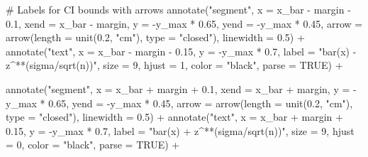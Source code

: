 \documentclass[
  letterpaper,
  DIV=11,
  numbers=noendperiod]{scrreprt}
\newenvironment{Shaded}{\begin{snugshade}}{\end{snugshade}}
\newcommand{\AttributeTok}[1]{\textcolor[rgb]{0.40,0.45,0.13}{#1}}
\newcommand{\CommentTok}[1]{\textcolor[rgb]{0.37,0.37,0.37}{#1}}
\newcommand{\ConstantTok}[1]{\textcolor[rgb]{0.56,0.35,0.01}{#1}}
\newcommand{\DecValTok}[1]{\textcolor[rgb]{0.68,0.00,0.00}{#1}}
\newcommand{\FloatTok}[1]{\textcolor[rgb]{0.68,0.00,0.00}{#1}}
\newcommand{\FunctionTok}[1]{\textcolor[rgb]{0.28,0.35,0.67}{#1}}
\newcommand{\NormalTok}[1]{\textcolor[rgb]{0.00,0.23,0.31}{#1}}
\newcommand{\SpecialCharTok}[1]{\textcolor[rgb]{0.37,0.37,0.37}{#1}}
\newcommand{\StringTok}[1]{\textcolor[rgb]{0.13,0.47,0.30}{#1}}
\begin{document}
\begin{Shaded}
\begin{Highlighting}[]
  \CommentTok{\# Labels for CI bounds with arrows}
  \FunctionTok{annotate}\NormalTok{(}\StringTok{"segment"}\NormalTok{, }\AttributeTok{x =}\NormalTok{ x\_bar }\SpecialCharTok{{-}}\NormalTok{ margin }\SpecialCharTok{{-}} \FloatTok{0.1}\NormalTok{, }\AttributeTok{xend =}\NormalTok{ x\_bar }\SpecialCharTok{{-}}\NormalTok{ margin, }
           \AttributeTok{y =} \SpecialCharTok{{-}}\NormalTok{y\_max }\SpecialCharTok{*} \FloatTok{0.65}\NormalTok{, }\AttributeTok{yend =} \SpecialCharTok{{-}}\NormalTok{y\_max }\SpecialCharTok{*} \FloatTok{0.45}\NormalTok{,}
           \AttributeTok{arrow =} \FunctionTok{arrow}\NormalTok{(}\AttributeTok{length =} \FunctionTok{unit}\NormalTok{(}\FloatTok{0.2}\NormalTok{, }\StringTok{"cm"}\NormalTok{), }\AttributeTok{type =} \StringTok{"closed"}\NormalTok{),}
           \AttributeTok{linewidth =} \FloatTok{0.5}\NormalTok{) }\SpecialCharTok{+}
  \FunctionTok{annotate}\NormalTok{(}\StringTok{"text"}\NormalTok{, }\AttributeTok{x =}\NormalTok{ x\_bar }\SpecialCharTok{{-}}\NormalTok{ margin }\SpecialCharTok{{-}} \FloatTok{0.15}\NormalTok{, }\AttributeTok{y =} \SpecialCharTok{{-}}\NormalTok{y\_max }\SpecialCharTok{*} \FloatTok{0.7}\NormalTok{, }
           \AttributeTok{label =} \StringTok{"bar(x) {-} z\^{}\textquotesingle{}*\textquotesingle{}*(sigma/sqrt(n))"}\NormalTok{,}
           \AttributeTok{size =} \DecValTok{9}\NormalTok{, }\AttributeTok{hjust =} \DecValTok{1}\NormalTok{, }\AttributeTok{color =} \StringTok{"black"}\NormalTok{, }\AttributeTok{parse =} \ConstantTok{TRUE}\NormalTok{) }\SpecialCharTok{+}
  
  \FunctionTok{annotate}\NormalTok{(}\StringTok{"segment"}\NormalTok{, }\AttributeTok{x =}\NormalTok{ x\_bar }\SpecialCharTok{+}\NormalTok{ margin }\SpecialCharTok{+} \FloatTok{0.1}\NormalTok{, }\AttributeTok{xend =}\NormalTok{ x\_bar }\SpecialCharTok{+}\NormalTok{ margin, }
           \AttributeTok{y =} \SpecialCharTok{{-}}\NormalTok{y\_max }\SpecialCharTok{*} \FloatTok{0.65}\NormalTok{, }\AttributeTok{yend =} \SpecialCharTok{{-}}\NormalTok{y\_max }\SpecialCharTok{*} \FloatTok{0.45}\NormalTok{,}
           \AttributeTok{arrow =} \FunctionTok{arrow}\NormalTok{(}\AttributeTok{length =} \FunctionTok{unit}\NormalTok{(}\FloatTok{0.2}\NormalTok{, }\StringTok{"cm"}\NormalTok{), }\AttributeTok{type =} \StringTok{"closed"}\NormalTok{),}
           \AttributeTok{linewidth =} \FloatTok{0.5}\NormalTok{) }\SpecialCharTok{+}
  \FunctionTok{annotate}\NormalTok{(}\StringTok{"text"}\NormalTok{, }\AttributeTok{x =}\NormalTok{ x\_bar }\SpecialCharTok{+}\NormalTok{ margin }\SpecialCharTok{+} \FloatTok{0.15}\NormalTok{, }\AttributeTok{y =} \SpecialCharTok{{-}}\NormalTok{y\_max }\SpecialCharTok{*} \FloatTok{0.7}\NormalTok{, }
           \AttributeTok{label =} \StringTok{"bar(x) + z\^{}\textquotesingle{}*\textquotesingle{}*(sigma/sqrt(n))"}\NormalTok{,}
           \AttributeTok{size =} \DecValTok{9}\NormalTok{, }\AttributeTok{hjust =} \DecValTok{0}\NormalTok{, }\AttributeTok{color =} \StringTok{"black"}\NormalTok{, }\AttributeTok{parse =} \ConstantTok{TRUE}\NormalTok{) }\SpecialCharTok{+}
  

\end{Highlighting}
\end{Shaded}
\end{document}
